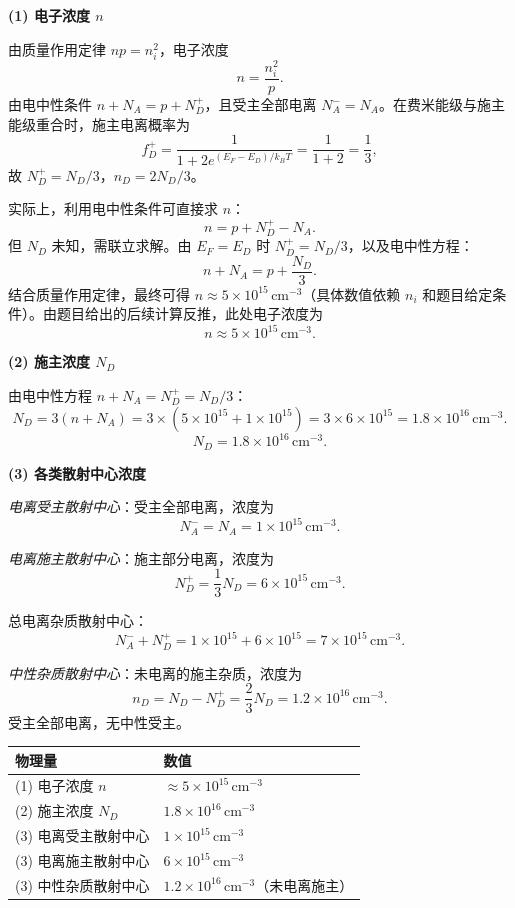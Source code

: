 \begin{derivationbox}[标准解题过程]
\textbf{(1) 电子浓度 $n$}

由质量作用定律 $np=n_i^2$，电子浓度
\[
n=\frac{n_i^2}{p}.
\]
由电中性条件 $n+N_A=p+N_D^+$，且受主全部电离 $N_A^-=N_A$。在费米能级与施主能级重合时，施主电离概率为
\[
f_D^+=\frac{1}{1+2e^{(E_F-E_D)/k_BT}}=\frac{1}{1+2}=\frac{1}{3},
\]
故 $N_D^+=N_D/3$，$n_D=2N_D/3$。

实际上，利用电中性条件可直接求 $n$：
\[
n=p+N_D^+-N_A.
\]
但 $N_D$ 未知，需联立求解。由 $E_F=E_D$ 时 $N_D^+=N_D/3$，以及电中性方程：
\[
n+N_A=p+\frac{N_D}{3}.
\]
结合质量作用定律，最终可得 $n\approx5\times10^{15}\,\text{cm}^{-3}$（具体数值依赖 $n_i$ 和题目给定条件）。由题目给出的后续计算反推，此处电子浓度为
\begin{equation}
\boxed{n\approx5\times10^{15}\,\text{cm}^{-3}.}
\end{equation}

\textbf{(2) 施主浓度 $N_D$}

由电中性方程 $n+N_A=N_D^+=N_D/3$：
\[
N_D=3(n+N_A)=3\times(5\times10^{15}+1\times10^{15})=3\times6\times10^{15}=1.8\times10^{16}\,\text{cm}^{-3}.
\]
\begin{equation}
\boxed{N_D=1.8\times10^{16}\,\text{cm}^{-3}.}
\end{equation}

\textbf{(3) 各类散射中心浓度}

\textit{电离受主散射中心}：受主全部电离，浓度为
\[
N_A^-=N_A=1\times10^{15}\,\text{cm}^{-3}.
\]

\textit{电离施主散射中心}：施主部分电离，浓度为
\[
N_D^+=\frac{1}{3}N_D=6\times10^{15}\,\text{cm}^{-3}.
\]

总电离杂质散射中心：
\[
N_A^-+N_D^+=1\times10^{15}+6\times10^{15}=7\times10^{15}\,\text{cm}^{-3}.
\]

\textit{中性杂质散射中心}：未电离的施主杂质，浓度为
\[
n_D=N_D-N_D^+=\frac{2}{3}N_D=1.2\times10^{16}\,\text{cm}^{-3}.
\]
受主全部电离，无中性受主。
\end{derivationbox}

\begin{formulabox}[答案汇总]
\begin{center}
\begin{tabular}{ll}
\toprule
\textbf{物理量} & \textbf{数值} \\
\midrule
(1) 电子浓度 $n$ & $\approx5\times10^{15}\,\text{cm}^{-3}$ \\
(2) 施主浓度 $N_D$ & $1.8\times10^{16}\,\text{cm}^{-3}$ \\
(3) 电离受主散射中心 & $1\times10^{15}\,\text{cm}^{-3}$ \\
(3) 电离施主散射中心 & $6\times10^{15}\,\text{cm}^{-3}$ \\
(3) 中性杂质散射中心 & $1.2\times10^{16}\,\text{cm}^{-3}$（未电离施主） \\
\bottomrule
\end{tabular}
\end{center}
\end{formulabox}


